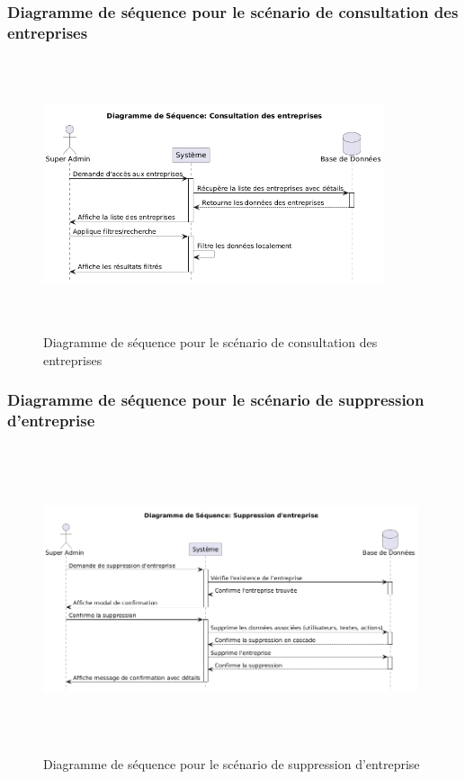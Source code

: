 \subsubsection{Diagramme de séquence pour le scénario de consultation des entreprises}
\begin{figure}[H]
    \centering
    \includegraphics[width=10cm,height=8cm]{images/consultcompanysq.png}
    \caption{Diagramme de séquence pour le scénario de consultation des entreprises}
\end{figure}

\subsubsection{Diagramme de séquence pour le scénario de suppression d'entreprise}
\begin{figure}[H]
    \centering
    \includegraphics[width=11cm,height=9cm]{images/deletecompanysq.png}
    \caption{Diagramme de séquence pour le scénario de suppression d'entreprise}
\end{figure}

